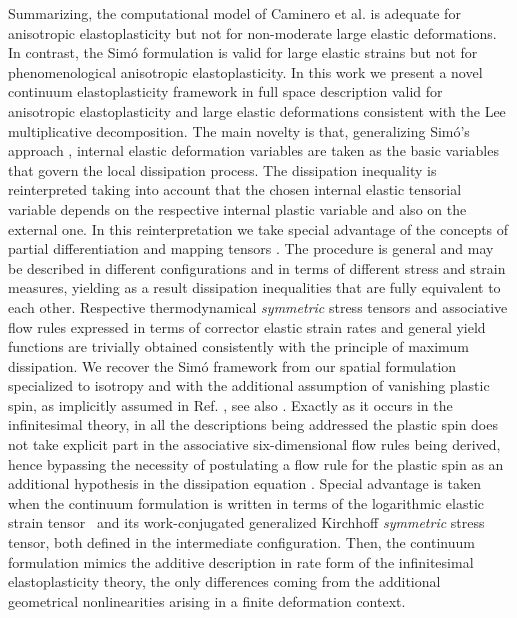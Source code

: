\documentclass[preprint,review,12pt,sort&compress]{elsarticle}%
\begin{document}
Summarizing, the computational model of Caminero et al.
\cite{CamineroMontansBathe11} is adequate for anisotropic elastoplasticity but
not for non-moderate large elastic deformations. In contrast, the Sim\'{o}
formulation \cite{Simo92} is valid for large elastic strains but not for
phenomenological anisotropic elastoplasticity. In this work we present a novel
continuum elastoplasticity framework in full space description valid for
anisotropic elastoplasticity and large elastic deformations consistent with
the Lee multiplicative decomposition. The main novelty is that, generalizing
Sim\'{o}'s approach \cite{Simo92}, internal elastic deformation variables are
taken as the basic variables that govern the local dissipation process. The
dissipation inequality is reinterpreted taking into account that the chosen
internal elastic tensorial variable depends on the respective internal plastic
variable and also on the external one. In this reinterpretation we take
special advantage of the concepts of partial differentiation and mapping
tensors \cite{LatMonAPM2016}. The procedure is general and may be described in
different configurations and in terms of different stress and strain measures,
yielding as a result dissipation inequalities that are fully equivalent to
each other. Respective thermodynamical \emph{symmetric} stress tensors and
associative flow rules expressed in terms of corrector elastic strain rates
and general yield functions are trivially obtained consistently with the
principle of maximum dissipation. We recover the Sim\'{o} framework from our
spatial formulation specialized to isotropy and with the additional assumption
of vanishing plastic spin, as implicitly assumed in Ref. \cite{Simo92}, see
also \cite{BonetWoodBook}. Exactly as it occurs in the infinitesimal theory,
in all the descriptions being addressed the plastic spin does not take
explicit part in the associative six-dimensional flow rules being derived,
hence bypassing the necessity of postulating a flow rule for the plastic spin
as an additional hypothesis in the dissipation equation \cite{Lubliner86}.
Special advantage is taken when the continuum formulation is written in terms
of the logarithmic elastic strain tensor \cite{LatMonIJSS2014}\ and its
work-conjugated generalized Kirchhoff \emph{symmetric} stress tensor, both
defined in the intermediate configuration. Then, the continuum formulation
mimics the additive description in rate form of the infinitesimal
elastoplasticity theory, the only differences coming from the additional
geometrical nonlinearities arising in a finite deformation context.
\end{document}
